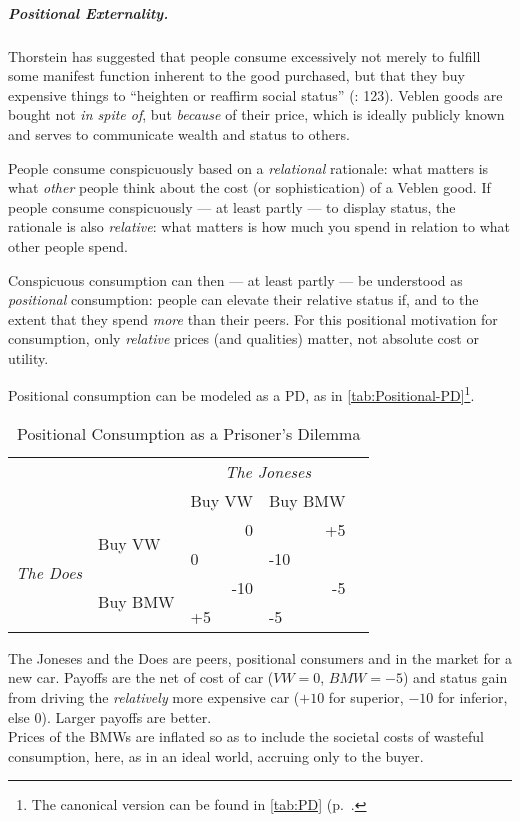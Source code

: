 \subparagraph{Positional Externality.}  \label{sec:positional-race} Thorstein \cite{Veblen1899} has suggested that people consume excessively not merely to fulfill some manifest function inherent to the good purchased, but that they buy expensive things to ``heighten or reaffirm social status'' (\citealt{Merton-1968-aa}: 123). Veblen goods are bought not \emph{in spite of}, but \emph{because} of their price, which is ideally publicly known and serves to communicate wealth and status to others.

People consume conspicuously based on a \emph{relational} rationale: what matters is what \emph{other} people think about the cost (or sophistication) of a Veblen good. If people consume conspicuously --- at least partly --- to display status, the rationale is also \emph{relative}: what matters is how much you spend in relation to what other people spend. 

Conspicuous consumption can then --- at least partly --- be understood as \emph{positional} consumption: people can elevate their relative status if, and to the extent that they spend \emph{more} than their peers. For this positional motivation for consumption, only \emph{relative} prices (and qualities) matter, not absolute cost or utility.

Positional consumption can be modeled as a \gls{PD}, as in \autoref{tab:Positional-PD}\footnote{
	The canonical version can be found in \autoref{tab:PD} (p.~\pageref{tab:PD}.}.

\begin{table}
	\caption{Positional Consumption as a Prisoner's Dilemma}
	\label{tab:Positional-PD}
	\begin{center}
	\begin{tabular}{m{1cm}m{}m{}m{}m{}}
		& & \multicolumn{2}{c}{\emph{The Joneses}} \\
		& &Buy VW & Buy BMW\\ 
		\cline{3-4}
		\multicolumn{1}{c}{\multirow{4}{*}{\emph{The Does}}} & \multirow{2}{2,3cm}{Buy VW} & 		\multicolumn{1}{|r|}{0} & \multicolumn{1}{r|}{+5}\\ 
		\multicolumn{1}{c}{} & \multicolumn{1}{c}{}& \multicolumn{1}{|l|}{0} & \multicolumn{1}{l|}{-10}\\ 
		\cline{3-4}
		\multicolumn{1}{c}{} & \multirow{2}{2,3cm}{Buy BMW} & \multicolumn{1}{|r|}{-10} & \multicolumn{1}{r|}{-5}\\ 
		\multicolumn{1}{c}{} & \multicolumn{1}{c}{}& \multicolumn{1}{|l|}{+5} & \multicolumn{1}{l|}{-5}\\ 
		\cline{3-4}
	\end{tabular}
	\end{center}
	\scriptsize{The Joneses and the Does are peers, positional consumers and in the market for a new car. Payoffs are the net of cost of car ($VW=0$, $BMW=-5$) and status gain from driving the \emph{relatively} more expensive car ($+10$ for superior, $-10$ for inferior, else $0$). Larger payoffs are better.\\
	Prices of the BMWs are inflated so as to include the societal costs of wasteful consumption, here, as in an ideal world, accruing only to the buyer.}
\end{table}

